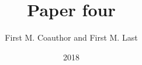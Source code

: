\documentclass[11pt, titlepage]{article}
\title{Paper four}
\author{First M. Coauthor and First M. Last}
\date{2018}
\begin{document}
\maketitle

\begin{abstract}
 \lipsum[1]
\end{abstract}

\clearpage

\lipsum[2-50]

\end{document}
